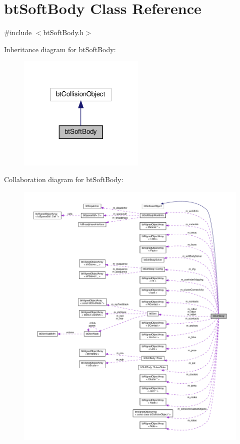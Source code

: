 \hypertarget{classbtSoftBody}{}\section{bt\+Soft\+Body Class Reference}
\label{classbtSoftBody}


{\ttfamily \#include $<$bt\+Soft\+Body.\+h$>$}



Inheritance diagram for bt\+Soft\+Body\+:
\nopagebreak
\begin{figure}[H]
\begin{center}
\leavevmode
\includegraphics[width=171pt]{classbtSoftBody__inherit__graph}
\end{center}
\end{figure}


Collaboration diagram for bt\+Soft\+Body\+:
\nopagebreak
\begin{figure}[H]
\begin{center}
\leavevmode
\includegraphics[width=350pt]{classbtSoftBody__coll__graph}
\end{center}
\end{figure}
